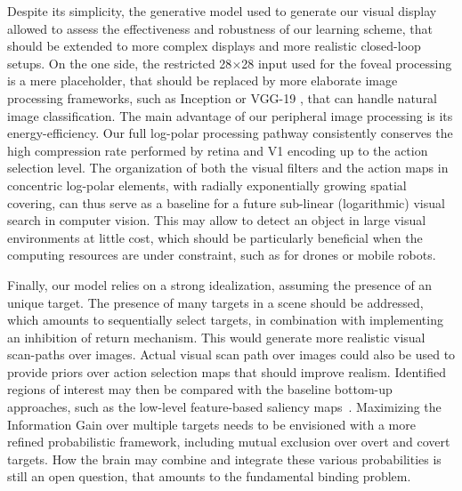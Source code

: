 Despite its simplicity, the generative model used to generate our visual display allowed to assess the effectiveness and robustness of our learning scheme, that should be extended to more complex displays and more realistic closed-loop setups.
On the one side, the restricted 28$\times$28 input used for the foveal processing is a mere placeholder, that should be replaced by more elaborate image processing frameworks, such as Inception \cite{szegedy2015going} or VGG-19
\cite{simonyan2014very}, that can handle natural image classification. 
The main advantage of our peripheral image processing is its  energy-efficiency. Our full log-polar processing pathway consistently conserves the high compression rate performed by retina and V1 encoding up to the action selection level. The organization of both the visual filters and the action maps in concentric log-polar elements, with radially exponentially growing spatial covering, can thus serve as a baseline for a future sub-linear (logarithmic) visual search in computer vision. This may allow to detect an object in large visual environments at little cost, which should be particularly beneficial when the computing resources are under constraint, such as for drones or mobile robots. 


Finally, our model relies on a strong idealization, assuming the presence of an unique target. The presence of many targets in a scene should be addressed, which amounts to sequentially select targets, in combination with implementing an inhibition of return mechanism. 
This would generate more realistic visual scan-paths over images. %
Actual visual scan path over images could also be used to provide priors over action selection maps that should improve realism.  %
Identified regions of interest may then be compared with the baseline bottom-up approaches, such as the low-level feature-based saliency maps~\cite{Itti01}. 
Maximizing the Information Gain over multiple targets needs to be envisioned with a more refined probabilistic framework, including mutual exclusion over overt and covert targets. How the brain may combine and integrate these various probabilities is still an open question, that amounts to the fundamental binding problem. %

